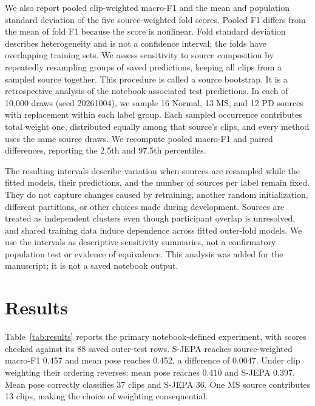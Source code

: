\documentclass[10pt,twocolumn,letterpaper]{article}
\begin{document}
We also report pooled clip-weighted macro-F1 and the mean and population standard deviation of the five source-weighted fold scores. Pooled F1 differs from the mean of fold F1 because the score is nonlinear. Fold standard deviation describes heterogeneity and is not a confidence interval; the folds have overlapping training sets. We assess sensitivity to source composition by repeatedly resampling groups of saved predictions, keeping all clips from a sampled source together. This procedure is called a source bootstrap. It is a retrospective analysis of the notebook-associated test predictions. In each of 10,000 draws (seed 20261004), we sample 16 Normal, 13 MS, and 12 PD sources with replacement within each label group. Each sampled occurrence contributes total weight one, distributed equally among that source's clips, and every method uses the same source draws. We recompute pooled macro-F1 and paired differences, reporting the 2.5th and 97.5th percentiles.

The resulting intervals describe variation when sources are resampled while the fitted models, their predictions, and the number of sources per label remain fixed. They do not capture changes caused by retraining, another random initialization, different partitions, or other choices made during development. Sources are treated as independent clusters even though participant overlap is unresolved, and shared training data induce dependence across fitted outer-fold models. We use the intervals as descriptive sensitivity summaries, not a confirmatory population test or evidence of equivalence. This analysis was added for the manuscript; it is not a saved notebook output.

\section{Results}
Table~\ref{tab:results} reports the primary notebook-defined experiment, with scores checked against its 88 saved outer-test rows. S-JEPA reaches source-weighted macro-F1 0.457 and mean pose reaches 0.452, a difference of 0.0047. Under clip weighting their ordering reverses: mean pose reaches 0.410 and S-JEPA 0.397. Mean pose correctly classifies 37 clips and S-JEPA 36. One MS source contributes 13 clips, making the choice of weighting consequential.
\end{document}
